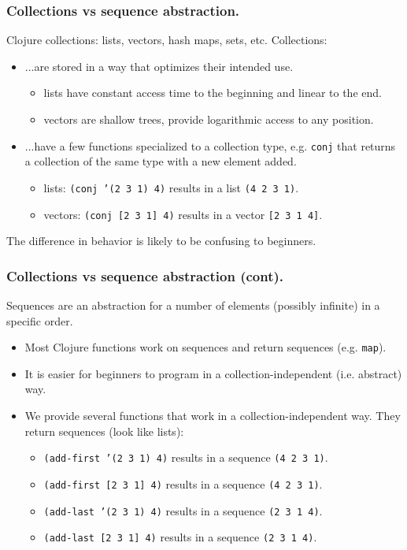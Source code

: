 \documentclass{beamer}
\begin{document}
\begin{frame}
\frametitle{Collections vs sequence abstraction.}
Clojure collections: lists, vectors, hash maps, sets, etc. Collections:
\begin{itemize}
\item ...are stored in a way that optimizes their intended use. 
\begin{itemize}
\item lists have constant access time to the beginning and linear to the end. 
\item vectors are shallow trees, provide logarithmic access to any position.
\end{itemize}
\item ...have a few functions specialized to a collection type, e.g. {\tt conj} that returns a collection of the same type with a new element added. 
\begin{itemize}
\item lists: {\tt (conj '(2 3 1) 4)} results in a list {\tt (4 2 3 1)}.
\item vectors: {\tt (conj [2 3 1] 4)} results in a vector {\tt [2 3 1 4]}.
\end{itemize}
\end{itemize}
The difference in behavior is likely to be confusing to beginners. 
\end{frame}

\begin{frame}
\frametitle{Collections vs sequence abstraction (cont).}
Sequences are an abstraction for a number of elements (possibly infinite) in a specific order. 
\begin{itemize}
\item Most Clojure functions work on sequences and return sequences (e.g. {\tt map}). 
\item It is easier for beginners to program in a collection-independent (i.e. abstract) way.
\item We provide several functions that work in a collection-independent way. They return sequences (look like lists):
\begin{itemize}
\item {\tt (add-first '(2 3 1) 4)} results in a sequence {\tt (4 2 3 1)}.
\item {\tt (add-first [2 3 1] 4)} results in a sequence {\tt (4 2 3 1)}.
\item {\tt (add-last '(2 3 1) 4)} results in a sequence {\tt (2 3 1 4)}.
\item {\tt (add-last [2 3 1] 4)} results in a sequence {\tt (2 3 1 4)}.
\end{itemize}
\end{itemize}
\end{frame}
\end{document}
